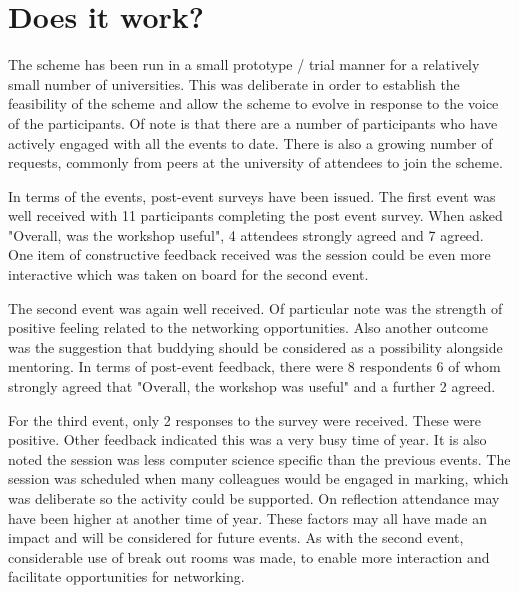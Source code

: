 \documentclass[sigconf]{acmart}
\begin{document}
\section{Does it work?}	
\label{Sec:DoesItWork}
The scheme has been run in a small prototype / trial manner for a relatively small number of universities. This was deliberate in order to establish the feasibility of the scheme and allow the scheme to evolve in response to the voice of the participants. Of note is that there are a number of participants who have actively engaged with all the events to date. There is also a growing number of requests, commonly from peers at the university of attendees to join the scheme. 

In terms of the events, post-event surveys have been issued. The first event was well received with 11 participants completing the post event survey. When asked "Overall, was the workshop useful", 4 attendees strongly agreed and 7 agreed. One item of constructive feedback received was the session could be even more interactive which was taken on board for the second event. 

The second event was again well received. Of particular note was the strength of positive feeling related to the networking opportunities. Also another outcome was the suggestion that buddying should be considered as a possibility alongside mentoring. In terms of post-event feedback, there were 8 respondents 6 of whom strongly agreed that "Overall, the workshop was useful" and a further 2 agreed.

For the third event, only 2 responses to the survey were received. These were positive. Other feedback indicated this was a very busy time of year. It is also noted the session was less computer science specific than the previous events. The session was scheduled when many colleagues would be engaged in marking, which was deliberate so the activity could be supported. On reflection attendance may have been higher at another time of year. These factors may all have made an impact and will be considered for future events. As with the second event, considerable use of break out rooms was made, to enable more interaction and facilitate opportunities for networking. 

\begin{comment}
TO DO - evaluation of Mentoring - PH what is needed here? Is sufficient to indicate the first pilot of 10 Mentees has been established? Or do we need feedback from the participants?
\end{comment}
\end{document}
